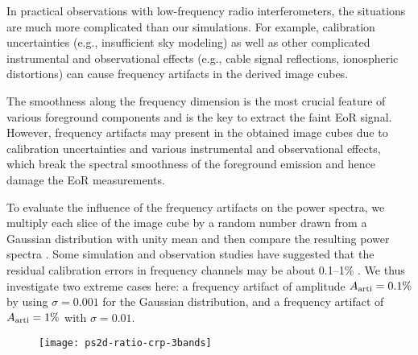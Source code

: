 In practical observations with low-frequency radio interferometers, the
situations are much more complicated than our simulations.
For example, calibration uncertainties (e.g., insufficient sky modeling)
as well as other complicated instrumental and observational effects
(e.g., cable signal reflections, ionospheric distortions) can cause
frequency artifacts in the derived image cubes.

The smoothness along the frequency dimension is the most crucial feature
of various foreground components and is the key to extract the faint EoR
signal.
However, frequency artifacts may present in the obtained image cubes due
to calibration uncertainties and various instrumental and observational
effects, which break the spectral smoothness of the foreground emission
and hence damage the EoR measurements.

To evaluate the influence of the frequency artifacts on the power
spectra, we multiply each slice of the image cube by a random number
drawn from a Gaussian distribution with unity mean and then compare
the resulting power spectra \cite{chapman2016}.
Some simulation and observation studies have suggested that the residual
calibration errors in frequency channels may be about \numrange{0.1}{1}\%
\cite{barry2016,beardsley2016,ewallWice2017}.
We thus investigate two extreme cases here:
a frequency artifact of amplitude $A_{\mathrm{arti}} = 0.1\%$ by
using $\sigma = 0.001$ for the Gaussian distribution,
and a frequency artifact of $A_{\mathrm{arti}} = 1\%$ with $\sigma = 0.01$.

\begin{figure}[htp]
  \centering
  \texttt{[image: ps2d-ratio-crp-3bands]}
  \label{fig:ps2d-ratio-crp}
\end{figure}

